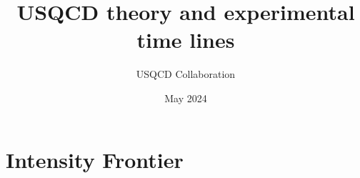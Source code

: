 \documentclass[12pt,hyperpdf]{article}
\title{USQCD theory and experimental time lines}
\author{USQCD Collaboration}
\date{May 2024}
\begin{document}


\maketitle

\setcounter{page}{1}

\tableofcontents

\clearpage
\setcounter{page}{1}

\section{Intensity Frontier}\label{sec:intensity}

\end{document}
